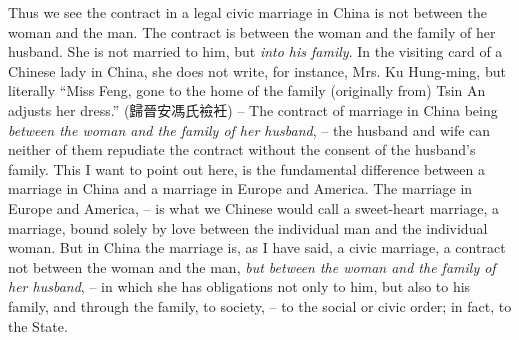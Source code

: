 Thus we see the contract in a legal civic marriage in China is not between the woman and the man.
The contract is between the woman and the family of her husband.
She is not married to him, but \emph{into his family}.
In the visiting card of a Chinese lady in China, she does not write, for instance, Mrs. Ku Hung-ming,
but literally ``Miss Feng, gone to the home of the family (originally from) Tsin An adjusts her dress.'' (歸晉安馮氏襝衽)
-- The contract of marriage in China being \emph{between the woman and the family of her husband},
-- the husband and wife can neither of them repudiate the contract without the consent of the husband's family.
This I want to point out here, is the fundamental difference between a marriage in China and a marriage in Europe and America.
The marriage in Europe and America,
-- is what we Chinese would call a sweet-heart marriage, a marriage,
bound solely by love between the individual man and the individual woman.
But in China the marriage is, as I have said, a civic marriage,
a contract not between the woman and the man,
\emph{but between the woman and the family of her husband},
-- in which she has obligations not only to him, but also to his family,
and through the family, to society,
-- to the social or civic order; in fact, to the State.

